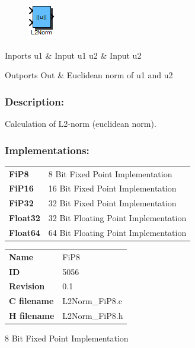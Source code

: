 \label{block:L2Norm}
\begin{figure}[H]\includegraphics{L2Norm}\end{figure} 

\begin{XtoCtabular}{Inports}
u1 & Input u1\tabularnewline
\hline
u2 & Input u2\tabularnewline
\hline
\end{XtoCtabular}


\begin{XtoCtabular}{Outports}
Out & Euclidean norm of u1 and u2\tabularnewline
\hline
\end{XtoCtabular}

\subsubsection*{Description:}
Calculation of L2-norm (euclidean norm).


\subsubsection*{Implementations:}
\begin{tabular}{l l}
\textbf{FiP8} & 8 Bit Fixed Point Implementation\tabularnewline
\textbf{FiP16} & 16 Bit Fixed Point Implementation\tabularnewline
\textbf{FiP32} & 32 Bit Fixed Point Implementation\tabularnewline
\textbf{Float32} & 32 Bit Floating Point Implementation\tabularnewline
\textbf{Float64} & 64 Bit Floating Point Implementation\tabularnewline
\end{tabular}

\nopagebreak[0]
\begin{tabular}{l l}
\textbf{Name} & FiP8 \tabularnewline
\textbf{ID} & 5056 \tabularnewline
\textbf{Revision} & 0.1 \tabularnewline
\textbf{C filename} & L2Norm\_FiP8.c \tabularnewline
\textbf{H filename} & L2Norm\_FiP8.h \tabularnewline
\end{tabular}
\vspace{1ex}

8 Bit Fixed Point Implementation


